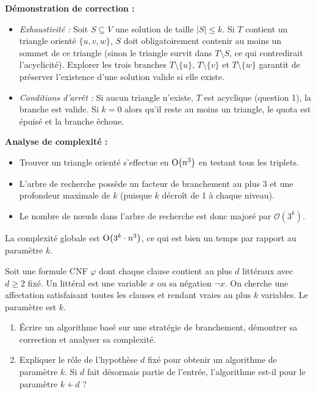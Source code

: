 \begin{td-sol}
\begin{enumerate}
        \textbf{Démonstration de correction :}
        \begin{itemize}
            \item \textit{Exhaustivité :} Soit \(S \subseteq V\) une solution de taille \(|S| \le k\). Si \(T\) contient un triangle orienté \(\{u, v, w\}\), \(S\) doit obligatoirement contenir au moins un sommet de ce triangle (sinon le triangle survit dans \(T \setminus S\), ce qui contredirait l'acyclicité). Explorer les trois branches \(T \setminus \{u\}\), \(T \setminus \{v\}\) et \(T \setminus \{w\}\) garantit de préserver l'existence d'une solution valide si elle existe.
            \item \textit{Conditions d'arrêt :} Si aucun triangle n'existe, \(T\) est acyclique (question 1), la branche est valide. Si \(k=0\) alors qu'il reste au moins un triangle, le quota est épuisé et la branche échoue.
        \end{itemize}

        \textbf{Analyse de complexité :}
        \begin{itemize}
            \item Trouver un triangle orienté s'effectue en \(\BigO{n^3}\) en testant tous les triplets.
            \item L'arbre de recherche possède un facteur de branchement au plus \(3\) et une profondeur maximale de \(k\) (puisque \(k\) décroît de 1 à chaque niveau).
            \item Le nombre de nœuds dans l'arbre de recherche est donc majoré par \(\mathcal{O}(3^k)\).
        \end{itemize}
        La complexité globale est \(\BigO{3^k \cdot n^3}\), ce qui est bien un temps  par rapport au paramètre \(k\).
    \end{enumerate}
\end{td-sol}


\begin{td-exo}
    Soit une formule CNF \(\varphi\) dont chaque clause contient au plus \(d\) littéraux avec \(d\geq 2\) fixé.
    Un littéral est une variable \(x\) ou sa négation \(\lnot x\).
    On cherche une affectation satisfaisant toutes les clauses et rendant vraies au plus \(k\) variables.
    Le paramètre est \(k\).

    \begin{enumerate}
        \item Écrire un algorithme basé sur une stratégie de branchement, démontrer sa correction et analyser sa complexité.

        \item Expliquer le rôle de l'hypothèse \og{}\(d\) fixé\fg{} pour obtenir un algorithme  de paramètre \(k\).
        Si \(d\) fait désormais partie de l'entrée, l'algorithme est-il  pour le paramètre \(k+d\) ?
    \end{enumerate}
\end{td-exo}
